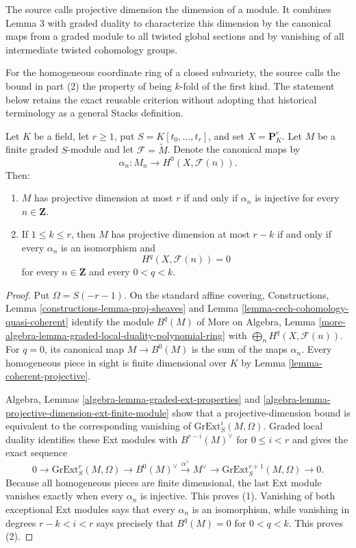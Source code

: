 \begin{lemma}
\label{lemma-graded-projective-dimension-cohomology}
\begin{reference}
\cite[Chapter III, \S 5, no. 77, Propositions 2 and 3,
pp. 271--272]{FAC}
\end{reference}
\begin{history}
The source calls projective dimension the dimension of a module. It combines
Lemma 3 with graded duality to characterize this dimension by the canonical
maps from a graded module to all twisted global sections and by vanishing of
all intermediate twisted cohomology groups.

For the homogeneous coordinate ring of a closed subvariety, the source calls
the bound in part (2) the property of being $k$-fold of the first kind. The
statement below retains the exact reusable criterion without adopting that
historical terminology as a general Stacks definition.
\end{history}
Let $K$ be a field, let $r\geq1$, put
$S=K[t_0,\ldots,t_r]$, and set $X=\mathbf P^r_K$. Let $M$ be a finite
graded $S$-module and let $\mathcal F=\widetilde M$. Denote the canonical
maps by
$$
\alpha_n:M_n\longrightarrow H^0(X,\mathcal F(n)).
$$
Then:
\begin{enumerate}
\item $M$ has projective dimension at most $r$ if and only if $\alpha_n$
is injective for every $n\in\mathbf Z$.
\item If $1\leq k\leq r$, then $M$ has projective dimension at most
$r-k$ if and only if every $\alpha_n$ is an isomorphism and
$$
H^q(X,\mathcal F(n))=0
$$
for every $n\in\mathbf Z$ and every $0<q<k$.
\end{enumerate}
\end{lemma}

\begin{proof}
Put $\Omega=S(-r-1)$. On the standard affine covering,
Constructions, Lemma \ref{constructions-lemma-proj-sheaves} and Lemma
\ref{lemma-cech-cohomology-quasi-coherent} identify the module $B^q(M)$ of
More on Algebra, Lemma
\ref{more-algebra-lemma-graded-local-duality-polynomial-ring} with
$\bigoplus_n H^q(X,\mathcal F(n))$. For $q=0$, its canonical map
$M\to B^0(M)$ is the sum of the maps $\alpha_n$. Every homogeneous piece
in sight is finite dimensional over $K$ by Lemma
\ref{lemma-coherent-projective}.

Algebra, Lemmas \ref{algebra-lemma-graded-ext-properties} and
\ref{algebra-lemma-projective-dimension-ext-finite-module} show
that a projective-dimension bound is equivalent to the corresponding
vanishing of $\text{GrExt}^i_S(M,\Omega)$. Graded local duality identifies
these Ext modules with $B^{r-i}(M)^\vee$ for $0\leq i<r$ and gives the
exact sequence
$$
0\to\text{GrExt}^r_S(M,\Omega)\to B^0(M)^\vee
\xrightarrow{\alpha^\vee}M^\vee\to
\text{GrExt}^{r+1}_S(M,\Omega)\to0.
$$
Because all homogeneous pieces are finite dimensional, the last Ext module
vanishes exactly when every $\alpha_n$ is injective. This proves (1).
Vanishing of both exceptional Ext modules says that every $\alpha_n$ is an
isomorphism, while vanishing in degrees
$r-k<i<r$ says precisely that $B^q(M)=0$ for $0<q<k$. This proves (2).
\end{proof}

